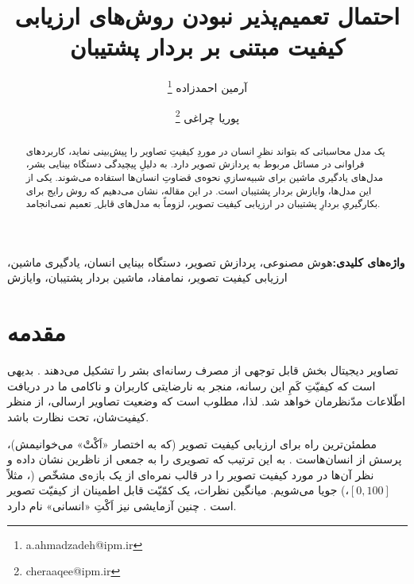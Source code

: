 \documentclass[twocolumn]{article}
\newcommand{\mykeyword}[1]{\par\textbf{واژه‌های کلیدی:}{#1}}
\begin{document}
\title{احتمال تعمیم‌پذیر نبودن روش‌های ارزیابی کیفیت مبتنی بر بردار پشتیبان}
\author{آرمین احمدزاده \thanks{a.ahmadzadeh@ipm.ir}}
\author{پوریا چراغی \thanks{cheraaqee@ipm.ir}}

\date{}

\maketitle
\begin{abstract}
	یک مدل محاسباتی که بتواند نظرِ انسان در موردِ کیفیتِ تصاویر را پیش‌بینی نماید، کاربردهای فراوانی در مسائل مربوط به پردازش تصویر دارد. به دلیلِ پیچیدگی دستگاه بینایی بشر، مدل‌های یادگیری ماشین برای شبیه‌سازیِ نحوه‌ی قضاوتِ انسان‌ها استفاده می‌شوند. یکی از این مدل‌ها، وایازش بردار پشتیبان است. در این مقاله، نشان می‌دهیم که روش رایج برای بکارگیریِ بردارِ پشتیبان در ارزیابی کیفیت تصویر، لزوماً به مدل‌های قابل ِ تعمیم نمی‌انجامد.
\end{abstract}
\mykeyword{هوش مصنوعی، پردازش تصویر، دستگاه بینایی انسان، یادگیری ماشین، ارزیابی کیفیت تصویر، نمامفاد، ماشین بردار پشتیبان، وایازش }




\section{مقدمه}
\label{sec:intro}
تصاویر دیجیتال بخش قابل توجهی از مصرف رسانه‌ای بشر را تشکیل می‌دهند \cite{cisco}. بدیهی است که کیفیّتِ کَمِ این رسانه، منجر به نارضایتی کاربران و ناکامی ما در دریافت اطّلاعات مدّنظرمان خواهد شد. لذا، مطلوب است که وضعیت تصاویر ارسالی، از منظر کیفیت‌شان، تحت نظارت باشد.

مطمئن‌ترین راه برای ارزیابی کیفیت تصویر (که به اختصار «اَکْتْ» می‌خوانیمش)، پرسش از انسان‌هاست \cite{allen2012manual}. به این ترتیب که تصویری را به جمعی از ناظرین نشان داده و نظر آن‌ها در مورد کیفیت تصویر را در قالب نمره‌ای از یک بازه‌ی مشخّص (، مثلاً $[0, 100]$،) جویا می‌شویم. میانگین نظرات، یک کمّیّت قابل اطمینان از کیفیّت تصویر است \cite{mohammadi2014subjective}. چنین آزمایشی نیز اَکْتِ «انسانی» نام دارد.
\end{document}
